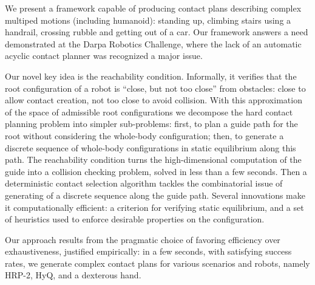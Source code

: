 We present a framework capable of producing contact plans describing complex multiped motions (including humanoid): standing up, climbing stairs using a handrail, crossing rubble and getting out of a car. Our framework answers a need demonstrated at the Darpa Robotics Challenge,
where the lack of an automatic acyclic contact planner was recognized a major issue. 

Our novel key idea is the reachability condition. Informally, it verifies that the root configuration of a robot is ``close, but not too close'' from obstacles: close to allow contact creation, not too close to avoid collision. With this approximation of the space of admissible root configurations we decompose the hard contact planning problem into simpler sub-problems: first, to plan a guide path for the root without considering the whole-body configuration; then, to generate a discrete sequence of whole-body configurations in static equilibrium along this path. The reachability condition turns the high-dimensional computation of the guide into a collision checking problem, solved in less than a few seconds. Then a deterministic contact selection algorithm tackles the combinatorial issue of  generating of a discrete sequence along the guide path. Several innovations make it computationally efficient: a criterion for verifying static equilibrium, and a set of heuristics used to enforce desirable properties on the configuration.

Our approach results from the pragmatic choice of favoring efficiency over exhaustiveness, justified empirically: in a few seconds, with satisfying success rates, we generate complex contact plans for various scenarios and robots, namely HRP-2, HyQ, and a dexterous hand.

